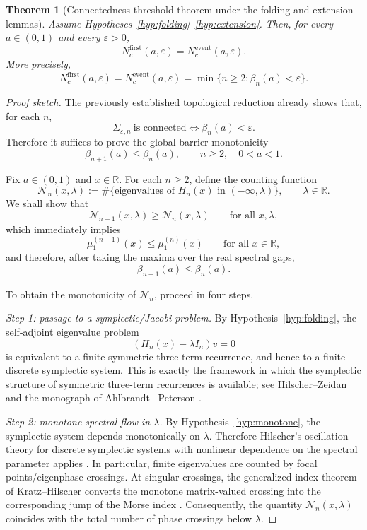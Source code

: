 \documentclass[11pt]{article}
\numberwithin{equation}{section}
\newtheorem{theorem}{Theorem}
\begin{document}
\begin{theorem}[Connectedness threshold theorem under the folding and extension lemmas]
\label{thm:conditional-threshold}
Assume Hypotheses~\ref{hyp:folding}--\ref{hyp:extension}. Then, for every
\(a\in(0,1)\) and every \(\varepsilon>0\),
\[
N_c^{\mathrm{first}}(a,\varepsilon)=N_c^{\mathrm{event}}(a,\varepsilon).
\]
More precisely,
\[
N_c^{\mathrm{first}}(a,\varepsilon)
=
N_c^{\mathrm{event}}(a,\varepsilon)
=
\min\{n\ge2:\beta_n(a)<\varepsilon\}.
\]
\end{theorem}

\begin{proof}[Proof sketch]
The previously established topological reduction already shows that, for each \(n\),
\[
\Sigma_{\varepsilon,n}\ \text{is connected}
\iff
\beta_n(a)<\varepsilon.
\]
Therefore it suffices to prove the global barrier monotonicity
\[
\beta_{n+1}(a)\le \beta_n(a),
\qquad n\ge2,\quad 0<a<1.
\]

Fix \(a\in(0,1)\) and \(x\in\mathbb R\). For each \(n\ge2\), define the counting function
\[
\mathcal N_n(x,\lambda)
:=
\#\bigl\{\text{eigenvalues of }H_n(x)\text{ in }(-\infty,\lambda)\bigr\},
\qquad \lambda\in\mathbb R.
\]
We shall show that
\[
\mathcal N_{n+1}(x,\lambda)\ge \mathcal N_n(x,\lambda)
\qquad\text{for all }x,\lambda,
\]
which immediately implies
\[
\mu_1^{(n+1)}(x)\le \mu_1^{(n)}(x)
\qquad\text{for all }x\in\mathbb R,
\]
and therefore, after taking the maxima over the real spectral gaps,
\[
\beta_{n+1}(a)\le \beta_n(a).
\]

To obtain the monotonicity of \(\mathcal N_n\), proceed in four steps.

\medskip
\noindent
\textit{Step 1: passage to a symplectic/Jacobi problem.}
By Hypothesis~\ref{hyp:folding}, the self-adjoint eigenvalue problem
\[
(H_n(x)-\lambda I_n)v=0
\]
is equivalent to a finite symmetric three-term recurrence, and hence to a finite discrete
symplectic system. This is exactly the framework in which the symplectic structure of symmetric
three-term recurrences is available; see Hilscher--Zeidan and the monograph of Ahlbrandt--
Peterson \cite{HZ2010,AhlbrandtPeterson}.

\medskip
\noindent
\textit{Step 2: monotone spectral flow in \(\lambda\).}
By Hypothesis~\ref{hyp:monotone}, the symplectic system depends monotonically on
\(\lambda\). Therefore Hilscher's oscillation theory for discrete symplectic systems with nonlinear
dependence on the spectral parameter applies \cite{Hilscher2012}. In particular, finite eigenvalues
are counted by focal points/eigenphase crossings. At singular crossings, the generalized index
theorem of Kratz--Hilscher converts the monotone matrix-valued crossing into the corresponding
jump of the Morse index \cite{KratzHilscher2013}. Consequently, the quantity \(\mathcal N_n(x,\lambda)\)
coincides with the total number of phase crossings below \(\lambda\).


\end{proof}
\end{document}
